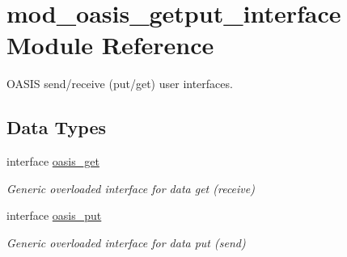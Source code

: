 \hypertarget{namespacemod__oasis__getput__interface}{}\section{mod\+\_\+oasis\+\_\+getput\+\_\+interface Module Reference}
\label{namespacemod__oasis__getput__interface}


O\+A\+S\+IS send/receive (put/get) user interfaces.  


\subsection*{Data Types}
\begin{DoxyCompactItemize}
\item 
interface \hyperlink{interfacemod__oasis__getput__interface_1_1oasis__get}{oasis\+\_\+get}
\begin{DoxyCompactList}\small\item\em Generic overloaded interface for data get (receive) \end{DoxyCompactList}\item 
interface \hyperlink{interfacemod__oasis__getput__interface_1_1oasis__put}{oasis\+\_\+put}
\begin{DoxyCompactList}\small\item\em Generic overloaded interface for data put (send) \end{DoxyCompactList}\end{DoxyCompactItemize}
